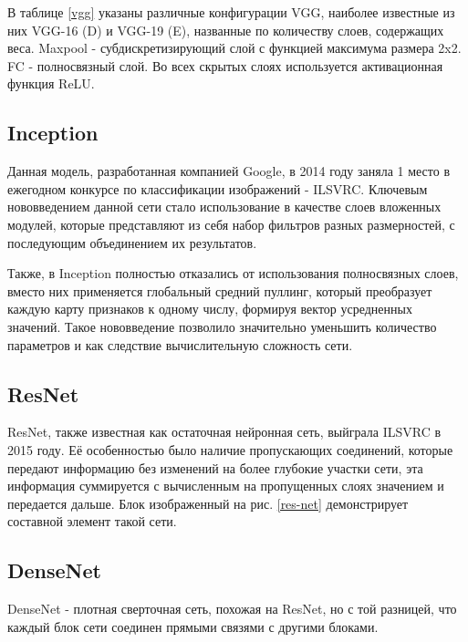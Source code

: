 В таблице \ref{vgg} указаны различные конфигурации VGG, наиболее известные из них VGG-16 (D) и VGG-19 (E), названные по количеству слоев, содержащих веса. Maxpool - субдискретизирующий слой с функцией максимума размера 2x2. FC - полносвязный слой. Во всех скрытых слоях используется активационная функция ReLU. 



\subsection{Inception}
Данная модель, разработанная компанией Google, в 2014 году заняла 1 место в ежегодном конкурсе по классификации изображений - ILSVRC\cite{1512.00567}. Ключевым нововведением данной сети стало использование в качестве слоев вложенных модулей, которые представляют из себя набор фильтров разных размерностей, с последующим объединением их результатов. 



Также, в Inception полностью отказались от использования полносвязных слоев, вместо них применяется глобальный средний пуллинг, который преобразует каждую карту признаков к одному числу, формируя вектор усредненных значений. Такое нововведение позволило значительно уменьшить количество параметров и как следствие вычислительную сложность сети.


\subsection{ResNet}
ResNet\cite{ResNet}, также известная как остаточная нейронная сеть, выйграла ILSVRC в 2015 году. Её особенностью было наличие пропускающих соединений, которые передают информацию без изменений на более глубокие участки сети, эта информация суммируется с вычисленным на пропущенных слоях значением и передается дальше. Блок изображенный на рис. \ref{res-net} демонстрирует составной элемент такой сети.



\subsection{DenseNet}
DenseNet\cite{DenseNet} - плотная сверточная сеть, похожая на ResNet, но с той разницей, что каждый блок сети соединен прямыми связями с другими блоками. 



\clearpage